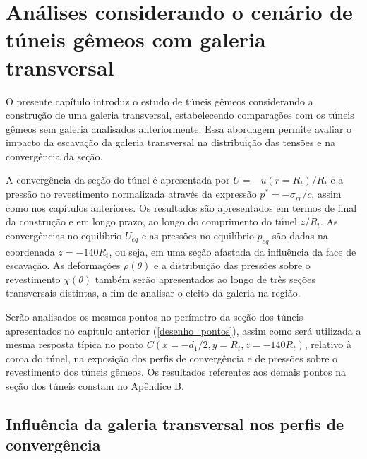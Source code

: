 %
%
%
%
\chapter{Análises considerando o cenário de túneis gêmeos com galeria transversal}

O presente capítulo introduz o estudo de túneis gêmeos considerando a construção de uma galeria transversal, estabelecendo comparações com os túneis gêmeos sem galeria analisados anteriormente. Essa abordagem permite avaliar o impacto da escavação da galeria transversal na distribuição das tensões e na convergência da seção. 

A convergência da seção do túnel é apresentada por $U=-u(r=R_t)/R_t$ e a pressão no revestimento normalizada através da expressão $p^{\ast}=-\sigma_{rr}/c$, assim como nos capítulos anteriores. Os resultados são apresentados em termos de final da construção e em longo prazo, ao longo do comprimento do túnel $z/R_t$. As convergências no equilíbrio $U_{eq}$ e as pressões no equilíbrio $p_{eq}$ são dadas na coordenada $z=-140R_t$, ou seja, em uma seção afastada da influência da face de escavação. As deformações $\rho(\theta)$ e a distribuição das pressões sobre o revestimento $\chi(\theta)$ também serão apresentados ao longo de três seções transversais distintas, a fim de analisar o efeito da galeria na região.

Serão analisados os mesmos pontos no perímetro da seção dos túneis apresentados no capítulo anterior (\autoref{desenho_pontos}), assim como será utilizada a mesma resposta típica no ponto $C(x=-d_1/2,y=R_t,z=-140R_t)$, relativo à coroa do túnel, na exposição dos perfis de convergência e de pressões sobre o revestimento dos túneis gêmeos. Os resultados referentes aos demais pontos na seção dos túneis constam no Apêndice B. 

\section{Influência da galeria transversal nos perfis de convergência}

